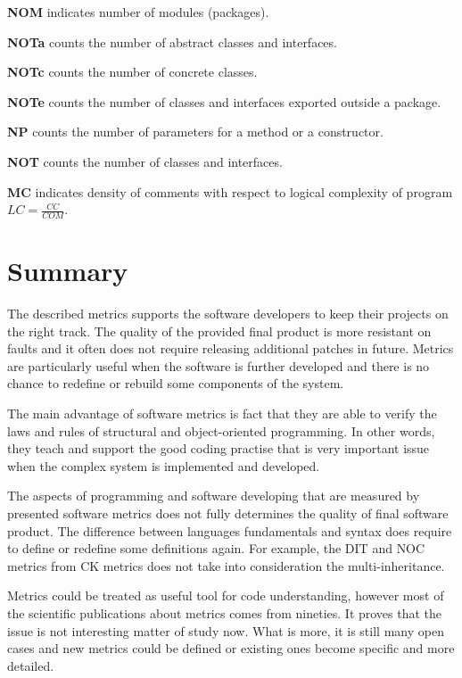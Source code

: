 \textbf{\ac{NOM}} indicates number of modules (packages).

\textbf{\ac{NOTa}} counts the number of abstract classes and interfaces.

\textbf{\ac{NOTc}} counts the number of concrete classes.	

\textbf{\ac{NOTe}} counts the number of classes and interfaces exported outside a package.

\textbf{\ac{NP}} counts the number of parameters for a method or a constructor.

\textbf{\ac{NOT}} counts the number of classes and interfaces.

\textbf{\ac{MC}} indicates density of comments with respect to logical complexity of program $LC=\frac { CC }{ COM } $.

\section{Summary}
The described metrics supports the software developers to keep their projects on the right track. The quality of the provided final product is more resistant on faults and it often does not require releasing additional patches in future. Metrics are particularly useful when the software is further developed and there is no chance to redefine or rebuild some components of the system.

The main advantage of software metrics is fact that they are able to verify the laws and rules of structural and object-oriented programming. In other words, they teach and support the good coding practise that is very important issue when the complex system is implemented and developed.

The aspects of programming and software developing that are measured by presented software metrics does not fully determines the quality of final software product. The difference between languages fundamentals and syntax does require to define or redefine some definitions again. For example, the \ac{DIT} and \ac{NOC} metrics from \ac{CK metrics} does not take into consideration the multi-inheritance.   

Metrics could be treated as useful tool for code understanding, however most of the scientific publications about metrics comes from nineties. It proves that the issue is not interesting matter of study now. What is more, it is still many open cases and new metrics could be defined or existing ones become specific and more detailed.